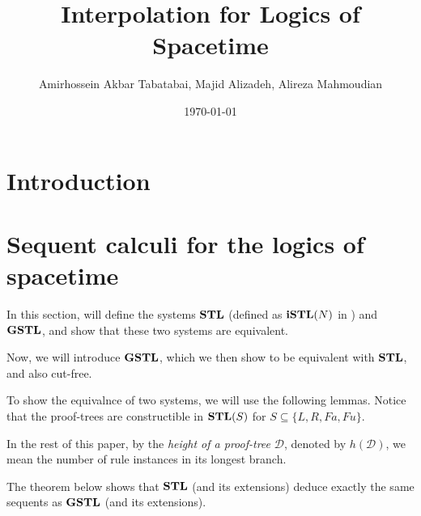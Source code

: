 \documentclass[12pt,a4paper]{article}
\begin{document}
    
\title{Interpolation for Logics of Spacetime}
\author[]{Amirhossein Akbar Tabatabai, Majid Alizadeh, Alireza Mahmoudian}
\affil[]{ }
\date{\today}
\maketitle

\begin{abstract}
	
\end{abstract}

\section{Introduction}


\section{Sequent calculi for the logics of spacetime}
In this section, will define the systems $\mathbf{STL}$ (defined as $\mathbf{iSTL}(N)$ in \cite{amir}) and $\mathbf{GSTL}$, and show that these two systems are equivalent.



Now, we will introduce $\mathbf{GSTL}$, which we then show to be equivalent with $\mathbf{STL}$, and also cut-free.



To show the equivalnce of two systems, we will use the following lemmas. Notice that the proof-trees are constructible in $\mathbf{STL}(S)$ for $S \subseteq \{ L, R, Fa, Fu \}$.


















In the rest of this paper, by the \emph{height of a proof-tree} $\mathcal{D}$, denoted by $h(\mathcal{D})$, we mean the number of rule instances in its longest branch.

The theorem below shows that $\mathbf{STL}$ (and its extensions) deduce exactly the same sequents as $\mathbf{GSTL}$ (and its extensions).


\end{document}
